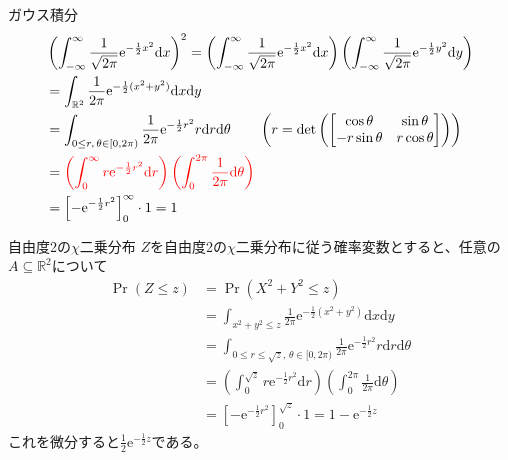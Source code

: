 \documentclass[lualatex,handout]{beamer}
\newcommand{\mycolor}[2]{%
  \begingroup
  \colorlet{currentcolor}{.}%
  \color{#1}#2%
  \color{currentcolor}%
  \endgroup
}
\newcommand{\emm}[1]{\mycolor{red}{#1}}
\theoremstyle{definition}
\begin{document}
\begin{frame}{ガウス積分}
\begin{align*}
&\left(\int_{-\infty}^\infty \frac1{\sqrt{2\pi}}\mathrm{e}^{-\frac12x^2}\mathrm{d}x\right)^2
=
\left(\int_{-\infty}^\infty \frac1{\sqrt{2\pi}}\mathrm{e}^{-\frac12x^2}\mathrm{d}x\right)
\left(\int_{-\infty}^\infty \frac1{\sqrt{2\pi}}\mathrm{e}^{-\frac12y^2}\mathrm{d}y\right)\\
&=
\int_{\mathbb{R}^2} \frac1{2\pi}\mathrm{e}^{-\frac12(x^2+y^2)}\mathrm{d}x\mathrm{d}y\\
&=
\int_{0\le r,\, \theta\in[0,2\pi)} \frac1{2\pi}\mathrm{e}^{-\frac12r^2}r\mathrm{d}r\mathrm{d}\theta\qquad \left(r = \det\left(\begin{bmatrix}\cos\theta&\sin\theta\\-r\sin\theta&r\cos\theta\end{bmatrix}\right)\right)\\
&=
\emm{
\left(\int_{0}^\infty r\mathrm{e}^{-\frac12r^2}\mathrm{d}r\right)
\left(\int_0^{2\pi} \frac1{2\pi}\mathrm{d}\theta\right)}\\
&=\left[-\mathrm{e}^{-\frac12r^2}\right]_0^\infty\cdot 1 = 1
\end{align*}
\end{frame}

\begin{frame}{自由度2の$\chi$二乗分布}
$Z$を自由度2の$\chi$二乗分布に従う確率変数とすると、任意の$A\subseteq\mathbb{R}^2$について
\begin{align*}
\Pr(Z\le z) &= \Pr(X^2 + Y^2 \le z)\\
&= \int_{x^2+y^2\le z} \frac1{2\pi}\mathrm{e}^{-\frac12(x^2+y^2)}\mathrm{d}x\mathrm{d}y\\
&=
\int_{0\le r\le \sqrt{z},\, \theta\in[0,2\pi)} \frac1{2\pi}\mathrm{e}^{-\frac12r^2}r\mathrm{d}r\mathrm{d}\theta\\
&=
\left(\int_{0}^{\sqrt{z}} r\mathrm{e}^{-\frac12r^2}\mathrm{d}r\right)
\left(\int_0^{2\pi} \frac1{2\pi}\mathrm{d}\theta\right)\\
&=\left[-\mathrm{e}^{-\frac12r^2}\right]_0^{\sqrt{z}}\cdot 1 = 1 - \mathrm{e}^{-\frac12 z}
\end{align*}
これを微分すると$\frac12 \mathrm{e}^{-\frac12 z}$である。
%

\end{frame}
\fi
\end{document}
